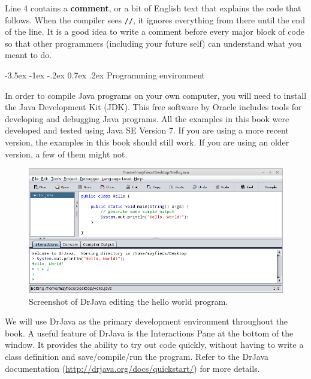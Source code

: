 \documentclass[12pt]{book}
\makeatletter
\theoremstyle{exercise}
\newcommand{\java}[1]{\verb"#1"}
\renewcommand{\section}{\@startsection {section}{1}{\z@}%
    {-3.5ex \@plus -1ex \@minus -.2ex}%
    {0.7ex \@plus.2ex}%
    {\normalfont\Large\bfseries}}
\newcommand{\java}[1]{\lstinline{#1}} %
\makeatother
\begin{document}

Line 4 contains a {\bf comment}, or a bit of English text that explains the code that follows.
When the compiler sees \java{//}, it ignores everything from there until the end of the line.
It is a good idea to write a comment before every major block of code so that other programmers (including your future self) can understand what you meant to do.


\section{Programming environment}


In order to compile Java programs on your own computer, you will need to install the Java Development Kit (JDK).
This free software by Oracle includes tools for developing and debugging Java programs.
All the examples in this book were developed and tested using Java SE Version 7.
If you are using a more recent version, the examples in this book should still work.
If you are using an older version, a few of them might not.

\begin{figure}[!h]
\begin{center}
\includegraphics[width=\textwidth]{figs/drjava-hello.png}
\caption{Screenshot of DrJava editing the hello world program.}
\end{center}
\end{figure}


We will use DrJava as the primary development environment throughout the book.
A useful feature of DrJava is the Interactions Pane at the bottom of the window.
It provides the ability to try out code quickly, without having to write a class definition and save/compile/run the program.
Refer to the DrJava documentation (\url{http://drjava.org/docs/quickstart/}) for more details.
\end{document}
